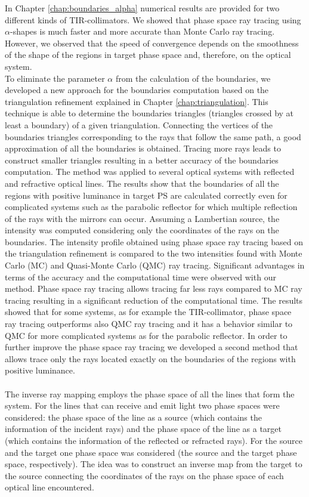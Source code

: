 In Chapter \ref{chap:boundaries_alpha} numerical results are provided for two different kinds of TIR-collimators. We showed that phase space ray tracing using $\alpha$-shapes is much faster and more accurate than Monte Carlo ray tracing. However, we observed that the speed of convergence depends on the smoothness of the shape of the regions in target phase space and, therefore, on the optical system. \\ \indent To eliminate the parameter $\alpha$ from the calculation of the boundaries, we developed a new approach for the boundaries computation based on the triangulation refinement explained in Chapter \ref{chap:triangulation}. This technique is able to determine the boundaries triangles (triangles crossed by at least a boundary) of a given triangulation. Connecting the vertices of the boundaries triangles corresponding to the rays that follow the same path, a good approximation of all the boundaries is obtained. Tracing more rays leads to construct smaller triangles resulting in a better accuracy of the boundaries computation. 
The method was applied to several optical systems with reflected and refractive optical lines. The results show that the boundaries of all the regions with positive luminance in target PS are calculated correctly even for complicated systems such as the parabolic reflector for which multiple reflection of the rays with the mirrors can occur. Assuming a Lambertian source, the intensity was computed considering only the coordinates of the rays on the boundaries. 
The intensity profile obtained using phase space ray tracing based on the triangulation refinement is compared to the two intensities found with Monte Carlo (MC) and Quasi-Monte Carlo (QMC) ray tracing. Significant advantages in terms of the accuracy and the computational time were observed with our method. Phase space ray tracing allows tracing far less rays compared to MC ray tracing resulting in a significant reduction of the computational time. The results showed that for some systems, as for example the TIR-collimator, phase space ray tracing outperforms also QMC ray tracing and it has a behavior similar to QMC for more complicated systems as for the parabolic reflector.
In order to further improve the phase space ray tracing we developed a second method that allows trace only the rays located exactly on the boundaries of the regions with positive luminance. 
\\ \\ \indent The inverse ray mapping employs the phase space of all the lines that form the system. For the lines that can receive and emit light two phase spaces were considered: the phase space of the line as a source (which contains the information of the incident rays) and the phase space of the line as a target (which contains the information of the reflected or refracted rays). For the source and the target one phase space was considered (the source and the target phase space, respectively). The idea was to construct an inverse map from the target to the source connecting the coordinates of the rays on the phase space of each optical line encountered. \\ \indent 
